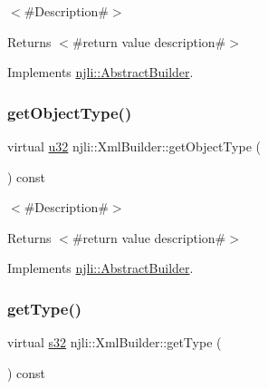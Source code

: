 $<$\#\+Description\#$>$

\begin{DoxyReturn}{Returns}
$<$\#return value description\#$>$ 
\end{DoxyReturn}


Implements \mbox{\hyperlink{classnjli_1_1_abstract_builder_a902f73ea78031b06aca183a417f3413b}{njli\+::\+Abstract\+Builder}}.

\mbox{\label{classnjli_1_1_xml_builder_ac067a387404bdbbe3229104d06c990ff}} 
\subsubsection{\texorpdfstring{get\+Object\+Type()}{getObjectType()}}
{\footnotesize\ttfamily virtual \mbox{\hyperlink{_util_8h_a10e94b422ef0c20dcdec20d31a1f5049}{u32}} njli\+::\+Xml\+Builder\+::get\+Object\+Type (\begin{DoxyParamCaption}{ }\end{DoxyParamCaption}) const\hspace{0.3cm}{\ttfamily [virtual]}}

$<$\#\+Description\#$>$

\begin{DoxyReturn}{Returns}
$<$\#return value description\#$>$ 
\end{DoxyReturn}


Implements \mbox{\hyperlink{classnjli_1_1_abstract_builder_a0f2d344fcf697b167f4f2b1122b5fb33}{njli\+::\+Abstract\+Builder}}.

\mbox{\label{classnjli_1_1_xml_builder_a1ae06385e2b3ad8ba50faf83aa907805}} 
\subsubsection{\texorpdfstring{get\+Type()}{getType()}}
{\footnotesize\ttfamily virtual \mbox{\hyperlink{_util_8h_aa62c75d314a0d1f37f79c4b73b2292e2}{s32}} njli\+::\+Xml\+Builder\+::get\+Type (\begin{DoxyParamCaption}{ }\end{DoxyParamCaption}) const\hspace{0.3cm}{\ttfamily [virtual]}}


